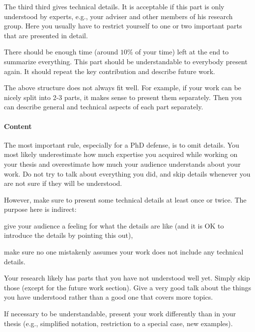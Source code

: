 \documentclass[12pt]{article}
\begin{document}
The third third gives technical details.
It is acceptable if this part is only understood by experts, e.g., your adviser and other members of his research group.
Here you usually have to restrict yourself to one or two important parts that are presented in detail.
\medskip

There should be enough time (around $10\%$ of your time) left at the end to summarize everything.
This part should be understandable to everybody present again.
It should repeat the key contribution and describe future work.
\medskip

The above structure does not always fit well.
For example, if your work can be nicely split into 2-3 parts, it makes sense to present them separately.
Then you can describe general and technical aspects of each part separately.

\paragraph{Content}
The most important rule, especially for a PhD defense, is to omit details.
You most likely underestimate how much expertise you acquired while working on your thesis and overestimate how much your audience understands about your work.
Do not try to talk about everything you did, and skip details whenever you are not sure if they will be understood.
\medskip

However, make sure to present some technical details at least once or twice.
The purpose here is indirect:
\begin{compactitem}
 \item give your audience a feeling for what the details are like (and it is OK to introduce the details by pointing this out),
 \item make sure no one mistakenly assumes your work does not include any technical details.
\end{compactitem}
\medskip

Your research likely has parts that you have not understood well yet.
Simply skip those (except for the future work section).
Give a very good talk about the things you have understood rather than a good one that covers more topics.

If necessary to be understandable, present your work differently than in your thesis (e.g., simplified notation, restriction to a special case, new examples).
\end{document}
